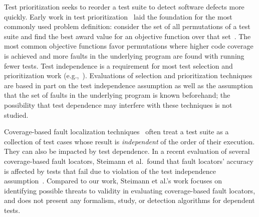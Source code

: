 Test prioritization seeks to reorder a test suite to detect
software defects more quickly. 
Early work in test
prioritization~\cite{Wong:1997:SER:851010.856115,Rothermel:1999:TCP:519621.853398}
laid the foundation for the most commonly used problem definition:
consider the set of all permutations of a test suite and find the best
award value for an objective function over that
set~\cite{Elbaum:2000:PTC:347324.348910}.  The most common objective
functions favor permutations where higher code coverage
is achieved and more faults in the underlying
program  are found with running fewer tests.
Test independence is
a requirement for most test selection and prioritization work (e.g.,~\cite[p.~1500]{Rummel:2005:TPR:1066677.1067016}).
Evaluations of selection and prioritization techniques~\cite[\emph{et alia}]{Rothermel:1999:TCP:519621.853398,Do:2010:ETC:1907658.1908088}
are based in part on the test independence
assumption as well as the assumption that the set of faults in the underlying
program is known beforehand; the possibility that test dependence may
interfere with these techniques is not studied.



Coverage-based fault localization techniques~\cite{Jones:2002:VTI}
often treat a test suite as a collection of test cases
whose result is \textit{independent} of the order of their
execution. They can also be impacted by test dependence.
In a recent evaluation of several coverage-based fault locators,
 Steimann et al.\ found that fault locators' accuracy is
 affected by tests that fail due to violation of the test
 independence assumption~\cite{Steimann:2013}. 
 Compared to our work, Steimann et al.'s
 work focuses on identifying possible threats to validity
 in evaluating coverage-based fault locators, and does
 not present any formalism, study, or detection algorithms
 for dependent tests.

